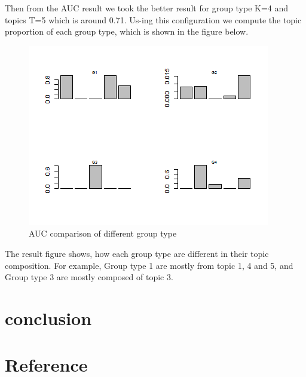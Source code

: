 \documentclass[letterpaper]{article}
\begin{document}
Then from the AUC result we took the better result for group type K=4 and topics T=5 which is around 0.71. Us-ing this configuration we compute the topic proportion of each group type, which is shown in the figure below.
\begin{figure}
\includegraphics[scale=0.6]{topicprop.png}
\caption{AUC comparison of different group type}
\end{figure}
The result figure shows, how each group type are different in their topic composition. For example, Group type 1 are mostly from topic 1, 4 and 5, and Group type 3 are mostly composed of topic 3. 
\section{conclusion}
\section{Reference}
\end{document}
